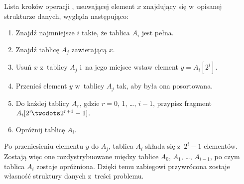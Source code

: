 \subproblem %
Lista kroków operacji , usuwającej element $x$ znajdujący się w~opisanej strukturze danych, wygląda następująco:
\begin{enumerate}
\item Znajdź najmniejsze $i$ takie, że tablica $A_i$ jest pełna.
\item Znajdź tablicę $A_j$ zawierającą $x$.
\item Usuń $x$ z~tablicy $A_j$ i~na jego miejsce wstaw element $y=A_i[2^i]$.
\item Przenieś element $y$ w~tablicy $A_j$ tak, aby była ona posortowana.
\item Do każdej tablicy $A_r$, gdzie $r=0$, 1, \dots, ${i-1}$, przypisz fragment $A_i[2^r\!\twodots2^{r+1}-1]$.
\item Opróżnij tablicę $A_i$.
\end{enumerate}
Po przeniesieniu elementu $y$ do $A_j$, tablica $A_i$ składa się z~$2^i-1$ elementów.
Zostają więc one rozdystrybuowane między tablice $A_0$, $A_1$, \dots, $A_{i-1}$, po czym tablica $A_i$ zostaje opróżniona.
Dzięki temu zabiegowi przywrócona zostaje własność struktury danych z~treści problemu.
